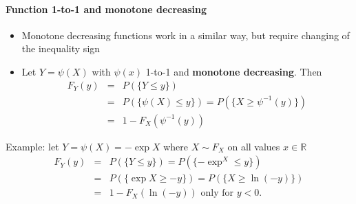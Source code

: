 \documentclass[notes=show,smaller,handout]{beamer}\usepackage[]{graphicx}\usepackage[]{color}
\renewcommand{\Pr}{P}
\newenvironment{stepitemize}{\begin{itemize}[<+->]}{\end{itemize} }
\begin{document}
\begin{frame}{\secname}
  \framesubtitle{Function 1-to-1 and monotone decreasing}

  \begin{stepitemize}
  \item Monotone decreasing functions work in a similar way, but require
  changing of the inequality sign

  \item Let $Y=\psi \left( X\right) $ with $\psi \left( x\right) $ 1-to-1 and
  \textbf{monotone decreasing}. Then
  \begin{eqnarray*}
  F_{Y}\left( y\right) &=&\Pr \left( \{ Y\leq y \} \right) \\
  &=&\Pr \left( \{ \psi \left( X\right) \leq y \} \right) =\Pr \left( \{ X\geq \psi
  ^{-1}\left( y\right) \} \right) \\
  &=&1-F_{X}\left( \psi ^{-1}\left( y\right) \right)
  \end{eqnarray*}

  \end{stepitemize}
  \begin{example}
  Example: let $Y=\psi \left( X\right) =-\exp X $ where $%
  X\sim F_X$ on all values $x\in
  \mathbb{R}
  $%
  \begin{eqnarray*}
  F_{Y}\left( y\right) &=&\Pr \left( \{ Y\leq y \}\right) =\Pr \left( \{ -\exp ^
  X \leq y \} \right) \\
  &=&\Pr \left( \{ \exp X \geq -y \} \right) =\Pr \left( \{ X\geq \ln
  \left( -y\right) \} \right) \\
  &=&1-F_{X}\left( \ln \left( -y\right) \right) \text{ only for }y<0\text{.}
  \end{eqnarray*}
  \end{example}
\end{frame}
\end{document}
